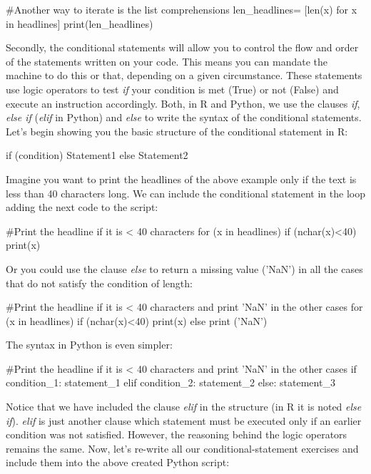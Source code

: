 \begin{examplepy}
#Another way to iterate is the list comprehensions
len_headlines= [len(x) for x in headlines]
print(len_headlines)
\end{examplepy}

Secondly, the conditional statements will allow you to control the flow and order of the statements written on your code. This means you can mandate the machine to do this or that, depending on a given circumstance. These statements use logic operators to test \emph{if} your condition is met (True) or not (False) and execute an instruction accordingly. Both, in R and Python, we use the clauses \emph{if}, \emph{else if} (\emph{elif} in Python) and \emph{else} to write the syntax of the conditional statements. Let's begin showing you the basic structure of the conditional statement in R:

\begin{exampler}
if (condition) {
    Statement1
} else {
    Statement2
}
\end{exampler}

Imagine you want to print the headlines of the above example only if the text is less than 40 characters long. We can include the conditional statement in the loop adding the next code to the script:

\begin{exampler}
#Print the headline if it is < 40 characters
for (x in headlines){
  if (nchar(x)<40) {
    print(x)}
  }
\end{exampler}

Or you could use the clause \emph{else} to return a missing value ('NaN') in all the cases that do not satisfy the condition of length:

\begin{exampler}
#Print the headline if it is < 40 characters and print 'NaN' in the other cases
for (x in headlines){
  if (nchar(x)<40) {
    print(x)}
  else 
    print ('NaN')}
\end{exampler}

The syntax in Python is even simpler:

\begin{examplepy}
#Print the headline if it is < 40 characters and print 'NaN' in the other cases
if condition_1:
    statement_1
elif condition_2:
    statement_2
else:
    statement_3
\end{examplepy}

Notice that we have included the clause \emph{elif} in the structure (in R it is noted \emph{else if}). \emph{elif} is just another clause which statement must be executed only if an earlier condition was not satisfied. However, the reasoning behind the logic operators remains the same. Now, let's re-write all our conditional-statement exercises and include them into the above created Python script:


